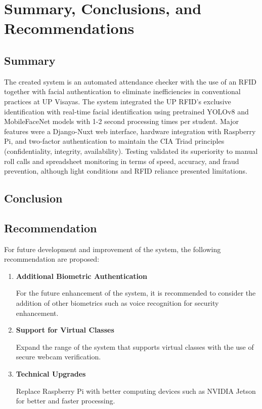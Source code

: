 \chapter{Summary, Conclusions, and Recommendations}

\section{Summary}

	The created system is an automated attendance checker with the use of an RFID together with facial authentication to eliminate inefficiencies in conventional practices at UP Visayas. The system integrated the UP RFID's exclusive identification with real-time facial identification using pretrained YOLOv8 and MobileFaceNet models with 1-2 second processing times per student. Major features were a Django-Nuxt web interface, hardware integration with Raspberry Pi, and two-factor authentication to maintain the CIA Triad principles (confidentiality, integrity, availability). Testing validated its superiority to manual roll calls and spreadsheet monitoring in terms of speed, accuracy, and fraud prevention, although light conditions and RFID reliance presented limitations.

\section{Conclusion}

\section{Recommendation}
	For future development and improvement of the system, the following recommendation are proposed:
	
	\begin{enumerate}
		\item \textbf{Additional Biometric Authentication}
	
		For the future enhancement of the system, it is recommended to consider the addition of other biometrics such as voice recognition for security enhancement.
		
		\item \textbf{Support for Virtual Classes}
		
		Expand the range of the system that supports virtual classes with the use of secure webcam verification.
		
		\item \textbf{Technical Upgrades}
		
		Replace Raspberry Pi with better computing devices such as NVIDIA Jetson for better and faster processing.
		
	\end{enumerate}
	